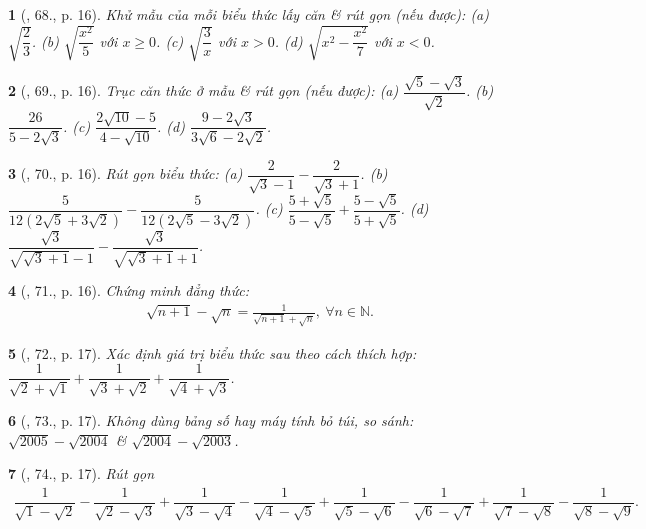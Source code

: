 \documentclass{article}
\newtheorem{baitoan}{}
\begin{document}
\begin{baitoan}[\cite{SBT_Toan_9_tap_1}, 68., p. 16]
	Khử mẫu của mỗi biểu thức lấy căn \& rút gọn (nếu được): (a) $\sqrt{\dfrac{2}{3}}$. (b) $\sqrt{\dfrac{x^2}{5}}$ với $x\ge0$. (c) $\sqrt{\dfrac{3}{x}}$ với $x > 0$. (d) $\sqrt{x^2 - \dfrac{x^2}{7}}$ với $x < 0$.
\end{baitoan}

\begin{baitoan}[\cite{SBT_Toan_9_tap_1}, 69., p. 16]
	Trục căn thức ở mẫu \& rút gọn (nếu được): (a) $\dfrac{\sqrt{5} - \sqrt{3}}{\sqrt{2}}$. (b) $\dfrac{26}{5 - 2\sqrt{3}}$. (c) $\dfrac{2\sqrt{10} - 5}{4 - \sqrt{10}}$. (d) $\dfrac{9 - 2\sqrt{3}}{3\sqrt{6} - 2\sqrt{2}}$.
\end{baitoan}

\begin{baitoan}[\cite{SBT_Toan_9_tap_1}, 70., p. 16]
	Rút gọn biểu thức: (a) $\dfrac{2}{\sqrt{3} - 1} - \dfrac{2}{\sqrt{3} + 1}$. (b) $\dfrac{5}{12(2\sqrt{5} + 3\sqrt{2})} - \dfrac{5}{12(2\sqrt{5} - 3\sqrt{2})}$. (c) $\dfrac{5 + \sqrt{5}}{5 - \sqrt{5}} + \dfrac{5 - \sqrt{5}}{5 + \sqrt{5}}$. (d) $\dfrac{\sqrt{3}}{\sqrt{\sqrt{3} + 1} - 1} - \dfrac{\sqrt{3}}{\sqrt{\sqrt{3} + 1} + 1}$.
\end{baitoan}

\begin{baitoan}[\cite{SBT_Toan_9_tap_1}, 71., p. 16]
	Chứng minh đẳng thức:
	\begin{align*}
		\sqrt{n + 1} - \sqrt{n} = \frac{1}{\sqrt{n + 1} + \sqrt{n}},\ \forall n\in\mathbb{N}.
	\end{align*}
\end{baitoan}

\begin{baitoan}[\cite{SBT_Toan_9_tap_1}, 72., p. 17]
	Xác định giá trị biểu thức sau theo cách thích hợp: $\dfrac{1}{\sqrt{2} + \sqrt{1}} + \dfrac{1}{\sqrt{3} + \sqrt{2}} + \dfrac{1}{\sqrt{4} + \sqrt{3}}$.
\end{baitoan}

\begin{baitoan}[\cite{SBT_Toan_9_tap_1}, 73., p. 17]
	Không dùng bảng số hay máy tính bỏ túi, so sánh: $\sqrt{2005} - \sqrt{2004}$ \& $\sqrt{2004} - \sqrt{2003}$.
\end{baitoan}

\begin{baitoan}[\cite{SBT_Toan_9_tap_1}, 74., p. 17]
	Rút gọn
	\begin{align*}
		\dfrac{1}{\sqrt{1} - \sqrt{2}} - \dfrac{1}{\sqrt{2} - \sqrt{3}} + \dfrac{1}{\sqrt{3} - \sqrt{4}} - \dfrac{1}{\sqrt{4} - \sqrt{5}} + \dfrac{1}{\sqrt{5} - \sqrt{6}} - \dfrac{1}{\sqrt{6} - \sqrt{7}} + \dfrac{1}{\sqrt{7} - \sqrt{8}} - \dfrac{1}{\sqrt{8} - \sqrt{9}}.
	\end{align*}
\end{baitoan}
\end{document}
